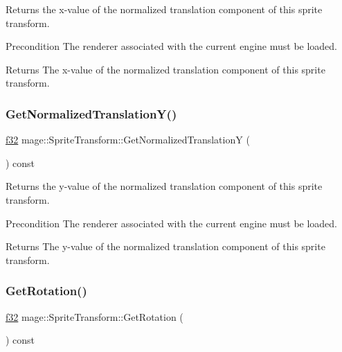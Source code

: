 Returns the x-\/value of the normalized translation component of this sprite transform.

\begin{DoxyPrecond}{Precondition}
The renderer associated with the current engine must be loaded. 
\end{DoxyPrecond}
\begin{DoxyReturn}{Returns}
The x-\/value of the normalized translation component of this sprite transform. 
\end{DoxyReturn}
\hypertarget{structmage_1_1_sprite_transform_af1831c549f306f660d87301d6024ea5a}{}\label{structmage_1_1_sprite_transform_af1831c549f306f660d87301d6024ea5a} 
\subsubsection{\texorpdfstring{Get\+Normalized\+Translation\+Y()}{GetNormalizedTranslationY()}}
{\footnotesize\ttfamily \hyperlink{namespacemage_a6a44ad388483959dc4dff9f2aef91431}{f32} mage\+::\+Sprite\+Transform\+::\+Get\+Normalized\+TranslationY (\begin{DoxyParamCaption}{ }\end{DoxyParamCaption}) const}

Returns the y-\/value of the normalized translation component of this sprite transform.

\begin{DoxyPrecond}{Precondition}
The renderer associated with the current engine must be loaded. 
\end{DoxyPrecond}
\begin{DoxyReturn}{Returns}
The y-\/value of the normalized translation component of this sprite transform. 
\end{DoxyReturn}
\hypertarget{structmage_1_1_sprite_transform_a56eb8b3e816803f9f4a673fb5c9db05b}{}\label{structmage_1_1_sprite_transform_a56eb8b3e816803f9f4a673fb5c9db05b} 
\subsubsection{\texorpdfstring{Get\+Rotation()}{GetRotation()}}
{\footnotesize\ttfamily \hyperlink{namespacemage_a6a44ad388483959dc4dff9f2aef91431}{f32} mage\+::\+Sprite\+Transform\+::\+Get\+Rotation (\begin{DoxyParamCaption}{ }\end{DoxyParamCaption}) const\hspace{0.3cm}{\ttfamily [noexcept]}}

